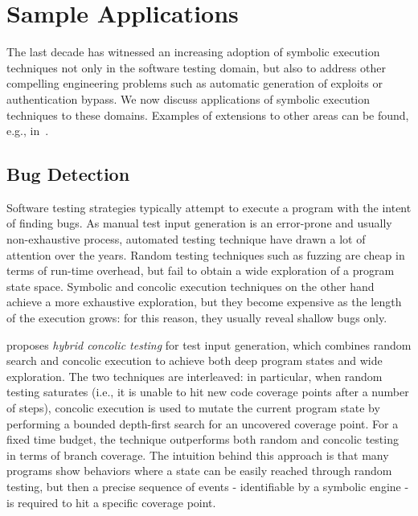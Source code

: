 
\section{Sample Applications}
\label{se:applications}

The last decade has witnessed an increasing adoption of symbolic execution techniques not only in the software testing domain, but also to address other compelling engineering problems such as automatic generation of exploits or authentication bypass. We now discuss  applications of symbolic execution techniques to these domains. Examples of extensions to other areas can be found, e.g., in~\cite{CGK-ICSE11}.

\subsection{Bug Detection}
\label{ss:bug-detection}

Software testing strategies typically attempt to execute a program with the intent of finding bugs. As manual test input generation is an error-prone and usually non-exhaustive process, automated testing technique have drawn a lot of attention over the years. Random testing techniques such as fuzzing are cheap in terms of run-time overhead, but fail to obtain a wide exploration of a program state space. Symbolic and concolic execution techniques on the other hand achieve a more exhaustive exploration, but they become expensive as the length of the execution grows: for this reason, they usually reveal shallow bugs only.

\cite{RK-ICSE07} proposes {\em hybrid concolic testing} for test input generation, which combines random search and concolic execution to achieve both deep program states and wide exploration. The two techniques are interleaved: in particular, when random testing saturates (i.e., it is unable to hit new code coverage points after a number of steps), concolic execution is used to mutate the current program state by performing a bounded depth-first search for an uncovered coverage point. For a fixed time budget, the technique outperforms both random and concolic testing in terms of branch coverage. The intuition behind this approach is that many programs show behaviors where a state can be easily reached through random testing, but then a precise sequence of events - identifiable by a symbolic engine - is required to hit a specific coverage point.

